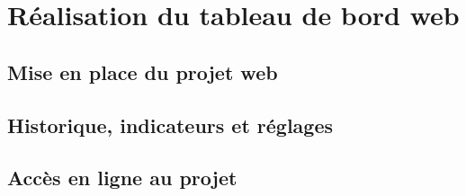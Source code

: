 
\section{Réalisation du tableau de bord web}


\subsection{Mise en place du projet web}

\subsection{Historique, indicateurs et réglages}

\subsection{Accès en ligne au projet}
